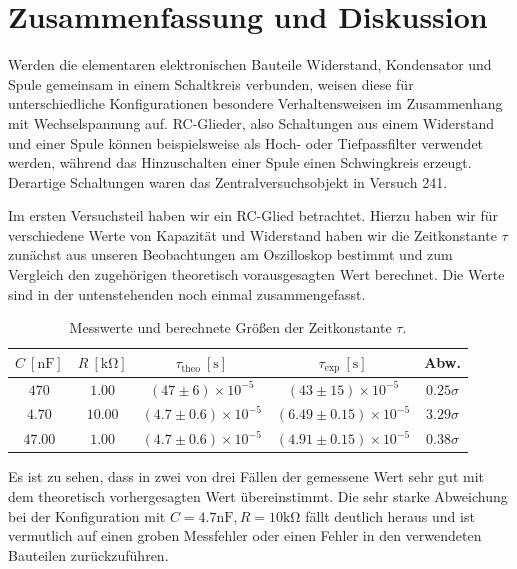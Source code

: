 \section{Zusammenfassung und Diskussion}

Werden die elementaren elektronischen Bauteile Widerstand, Kondensator und Spule gemeinsam in einem Schaltkreis verbunden, weisen diese für unterschiedliche Konfigurationen besondere Verhaltensweisen im Zusammenhang mit Wechselspannung auf. RC-Glieder, also Schaltungen aus einem Widerstand und einer Spule können beispielsweise als Hoch- oder Tiefpassfilter verwendet werden, während das Hinzuschalten einer Spule einen Schwingkreis erzeugt. Derartige Schaltungen waren das Zentralversuchsobjekt in Versuch 241.

Im ersten Versuchsteil haben wir ein RC-Glied betrachtet. Hierzu haben wir für verschiedene Werte von Kapazität und Widerstand haben wir die Zeitkonstante $\tau$ zunächst aus unseren Beobachtungen am Oszilloskop bestimmt und zum Vergleich den zugehörigen theoretisch vorausgesagten Wert berechnet. Die Werte sind in der untenstehenden  noch einmal zusammengefasst.


\renewcommand{\arraystretch}{1.5}
\begin{table}[H]
  \centering
  \caption{Messwerte und berechnete Größen der Zeitkonstante $\tau$.}
  \vspace*{1em}
  \begin{tabular}{| c | c | c | c | c |}
      \hline
      $C\ [\si{\nano\farad}]$ & $R\ [\si{\kilo\ohm}]$ & $\tau_{\text{theo}}\  [\si{\second}]$ & $\tau_{\text{exp}}\ [\si{\second}]$ & Abw. \\
      \hline
      $470$ & $1.00$ & $(47 \pm 6) \times 10^{-5}$ & $(43 \pm 15) \times 10^{-5}$ & $0.25\sigma$ \\
      \hline
      $4.70$ & $10.00$ & $(4.7 \pm 0.6) \times 10^{-5}$ & $(6.49 \pm 0.15) \times 10^{-5}$ & $3.29\sigma$ \\
      \hline
      $47.00$ & $1.00$ & $(4.7 \pm 0.6) \times 10^{-5}$ & $(4.91 \pm 0.15) \times 10^{-5}$ & $0.38\sigma$ \\
      \hline
  \end{tabular}
  \label{tab:zsmf_a1_zeitkonst}
\end{table}
\renewcommand{\arraystretch}{1}

Es ist zu sehen, dass in zwei von drei Fällen der gemessene Wert sehr gut mit dem theoretisch vorhergesagten Wert übereinstimmt. Die sehr starke Abweichung bei der Konfiguration mit $C = 4.7\si{\nano\farad}, R = 10\si{\kilo\ohm}$ fällt deutlich heraus und ist vermutlich auf einen groben Messfehler oder einen Fehler in den verwendeten Bauteilen zurückzuführen.

